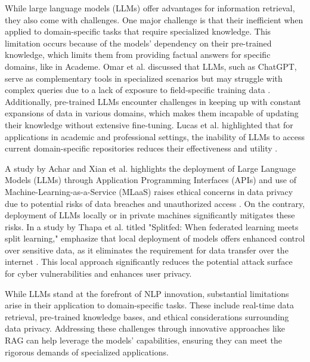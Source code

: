 \begin{refsection}
\bigbreak
\hspace{0.4cm}While large language models (LLMs) offer advantages for information retrieval, they also come with challenges. One major challenge is that their inefficient when applied to domain-specific tasks that require specialized knowledge. This limitation occurs because of the models' dependency on their pre-trained knowledge, which limits them from providing factual answers for specific domains, like in Academe. Omar et al. discussed that LLMs, such as ChatGPT, serve as complementary tools in specialized scenarios but may struggle with complex queries due to a lack of exposure to field-specific training data \cite{khraisha2024can}. Additionally, pre-trained LLMs encounter challenges in keeping up with constant expansions of data in various domains, which makes them incapable of updating their knowledge without extensive fine-tuning. Lucas et al. highlighted that for applications in academic and professional settings, the inability of LLMs to access current domain-specific repositories reduces their effectiveness and utility \cite{gartlehner2023data}.


\bigbreak
\hspace{0.4cm}A study by Achar and Xian et al. highlights the deployment of Large Language Models (LLMs) through Application Programming Interfaces (APIs) and use of Machine-Learning-as-a-Service (MLaaS) raises ethical concerns in data privacy due to potential risks of data breaches and unauthorized access \cite{omar2024applications} \cite{lucas2024systematic}. On the contrary, deployment of LLMs locally or in private machines significantly mitigates these risks. In a study by Thapa et al. titled "Splitfed: When federated learning meets split learning," emphasize that local deployment of models offers enhanced control over sensitive data, as it eliminates the requirement for data transfer over the internet \cite{achar2018data}. This local approach significantly reduces the potential attack surface for cyber vulnerabilities and enhances user privacy.

\bigbreak
\hspace{0.4cm}While LLMs stand at the forefront of NLP innovation, substantial limitations arise in their application to domain-specific tasks. These include real-time data retrieval, pre-trained knowledge bases, and ethical considerations surrounding data privacy. Addressing these challenges through innovative approaches like RAG can help leverage the models' capabilities, ensuring they can meet the rigorous demands of specialized applications.



\end{refsection}
